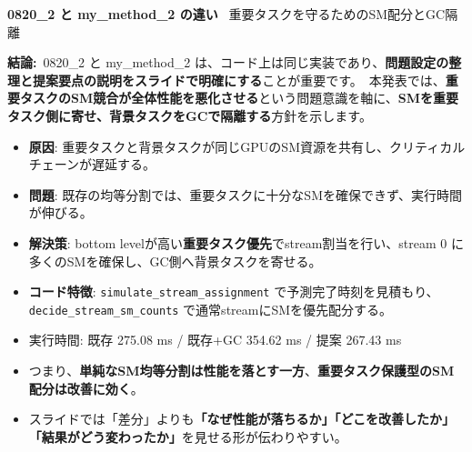 \documentclass[a4paper,11pt,lualatex,ja=standard]{bxjsarticle}
\begin{document}
\begin{center}
{\Large \bfseries 0820\_2 と my\_method\_2 の違い}\
\vspace{2mm}
{\small 重要タスクを守るためのSM配分とGC隔離}
\end{center}

\vspace{3mm}

\noindent
\textbf{結論:}\
0820\_2 と my\_method\_2 は、コード上は同じ実装であり、\textbf{問題設定の整理と提案要点の説明をスライドで明確にする}ことが重要です。\
本発表では、\textbf{重要タスクのSM競合が全体性能を悪化させる}という問題意識を軸に、\textbf{SMを重要タスク側に寄せ、背景タスクをGCで隔離する}方針を示します。

\vspace{2mm}
\begin{itemize}[leftmargin=7mm,itemsep=1mm]
  \item \textbf{原因}: 重要タスクと背景タスクが同じGPUのSM資源を共有し、クリティカルチェーンが遅延する。
  \item \textbf{問題}: 既存の均等分割では、重要タスクに十分なSMを確保できず、実行時間が伸びる。
  \item \textbf{解決策}: bottom levelが高い\textbf{重要タスク優先}でstream割当を行い、stream 0 に多くのSMを確保し、GC側へ背景タスクを寄せる。
  \item \textbf{コード特徴}: \verb|simulate_stream_assignment| で予測完了時刻を見積もり、\verb|decide_stream_sm_counts| で通常streamにSMを優先配分する。
\end{itemize}

\vspace{2mm}

\vspace{2mm}
\begin{itemize}[leftmargin=7mm,itemsep=1mm]
  \item 実行時間: 既存 275.08 ms / 既存+GC 354.62 ms / 提案 267.43 ms
  \item つまり、\textbf{単純なSM均等分割は性能を落とす一方}、\textbf{重要タスク保護型のSM配分は改善に効く}。
  \item スライドでは「差分」よりも\textbf{「なぜ性能が落ちるか」「どこを改善したか」「結果がどう変わったか」}を見せる形が伝わりやすい。
\end{itemize}
\end{document}
